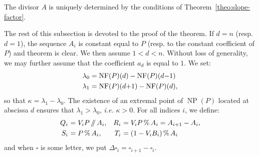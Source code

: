 \documentclass{sig-alternate-2013}
\DeclareMathOperator{\NP}{NP}
\newcommand{\NF}{\text{\rm NF}}
\renewcommand{\mod}{\,\%\,}
\renewcommand{\div}{\,/\hspace{-0.3em}/\,}
\begin{document}

%

\begin{rem}
The divisor $A$ is uniquely determined by the conditions of 
Theorem~\ref{theo:slope-factor}.
\end{rem}

The rest of this subsection is devoted to the proof of the theorem.
If $d = n$ (resp. $d = 1$), the sequence $A_i$ is constant equal to
$P$ (resp. to the constant coefficient of $P$) and theorem is clear.
We then assume $1 < d < n$. Without loss of generality, we may further 
assume that the coefficient $a_d$ is equal to $1$. We set:
\begin{align*}
\lambda_0 & = \NF(P)(d) - \NF(P)(d{-}1) \\
\lambda_1 & = \NF(P)(d{+}1) - \NF(P)(d),
\end{align*}
so that $\kappa = \lambda_1 - \lambda_0$.
The existence of an extremal point of $\NP(P)$ located at abscissa
$d$ ensures that $\lambda_1 > \lambda_0$, \emph{i.e.} $\kappa > 0$.
For all indices $i$, we define:
$$\begin{array}{r@{\,\,}lr@{\,\,}l}
Q_i &= V_i P \div A_i, &
R_i & = V_i P \mod A_i = A_{i+1} - A_i, 
\smallskip \\
S_i &= P \mod A_i, &
T_i &= (1 - V_i B_i) \mod A_i
\end{array}$$
and when $\square$ is some letter, we put $\Delta \square_i = \square_{i+1} 
- \square_i$.
\end{document}
